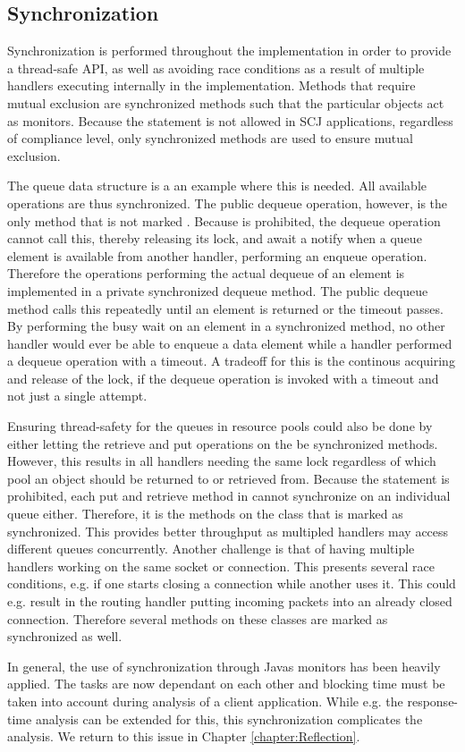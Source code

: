 \subsection{Synchronization} %
\label{sub:synchronization}
Synchronization is performed throughout the implementation in order to provide a thread-safe API, as well as avoiding race conditions as a result of multiple handlers executing internally in the implementation. Methods that require mutual exclusion are synchronized methods such that the particular objects act as monitors. Because the  statement is not allowed in SCJ applications, regardless of compliance level, only synchronized methods are used to ensure mutual exclusion.

The queue data structure is a an example where this is needed. All available operations are thus synchronized. The public dequeue operation, however, is the only method that is not marked . Because  is prohibited, the dequeue operation cannot call this, thereby releasing its lock, and await a notify when a queue element is available from another handler, performing an enqueue operation. Therefore the operations performing the actual dequeue of an element is implemented in a private synchronized dequeue method. The public dequeue method calls this repeatedly until an element is returned or the timeout passes. By performing the busy wait on an element in a synchronized method, no other handler would ever be able to enqueue a data element while a handler performed a dequeue operation with a timeout. A tradeoff for this is the continous acquiring and release of the lock, if the dequeue operation is invoked with a timeout and not just a single attempt.

Ensuring thread-safety for the queues in resource pools could also be done by either letting the retrieve and put operations on the  be synchronized methods. However, this results in all handlers needing the same lock regardless of which pool an object should be returned to or retrieved from. Because the  statement is prohibited, each put and retrieve method in  cannot synchronize on an individual queue either. Therefore, it is the methods on the  class that is marked as synchronized. This provides better throughput as multipled handlers may access different queues concurrently. Another challenge is that of having multiple handlers working on the same socket or connection. This presents several race conditions, e.g. if one starts closing a connection while another uses it. This could e.g. result in the routing handler putting incoming packets into an already closed connection. Therefore several methods on these classes are marked as synchronized as well.

In general, the use of synchronization through Javas monitors has been heavily applied. The tasks are now dependant on each other and blocking time must be taken into account during analysis of a client application. While e.g. the response-time analysis can be extended for this\cite{alan2001real}, this synchronization complicates the analysis. We return to this issue in Chapter \ref{chapter:Reflection}.
